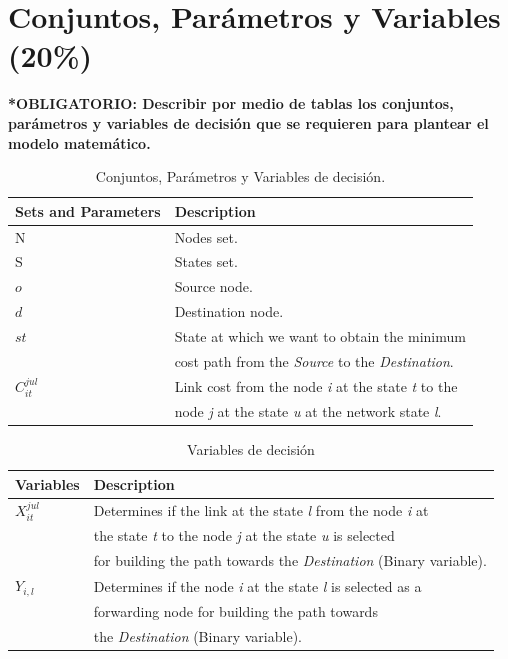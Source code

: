 \documentclass[runningheads]{llncs}
\begin{document}
\section{Conjuntos, Par\'{a}metros y Variables (20\%)}

\textbf{*OBLIGATORIO: Describir por medio de tablas los conjuntos, par\'{a}metros y variables de decisi\'{o}n que se requieren para plantear el modelo matem\'{a}tico.}

\begin{table}[h]
	\caption{Conjuntos, Par\'{a}metros y Variables de decisi\'{o}n. \label{Tab: tab1}}
	\begin{tabular*}{\hsize}{@{\extracolsep{\fill}}ll@{}}
		\hline
		\textbf{Sets and Parameters} & \textbf{Description}\\
		\hline
		N &   Nodes set.\\
		S  & States set. \\
		$o$  & Source node.\\
		$d$  & Destination node.\\
		$st$  & State at which we want to obtain the minimum  \\
		& cost path from the \textit{Source} to the \textit{Destination}.\\
		$C_{it}^{jul}$ & Link cost from the node \textit{i} at the state \textit{t} to the \\ 
		& node \textit{j} at the state \textit{u} at the network state \textit{l}.\\
		\hline
	\end{tabular*}
\end{table}

\begin{table}[h]
	\caption{Variables de decisi\'{o}n}
	\begin{tabular*}{\hsize}{@{\extracolsep{\fill}}ll@{}}
		\hline
		\textbf{Variables} & \textbf{Description}\\
		\hline
		$X_{it}^{jul}$ &  Determines if the link at the state \textit{l} from the node \textit{i} at  \\ 
		&  the state \textit{t} to the node \textit{j} at the state \textit{u} is selected \\
		&  for building the path towards the \textit{Destination} (Binary variable). \\
		$Y_{i,l}$ &  Determines if the node \textit{i} at the state \textit{l} is selected as a \\
		&  forwarding node for building the path towards \\
		&  the \textit{Destination} (Binary variable).\\
		\hline
	\end{tabular*}
\end{table}
\end{document}
